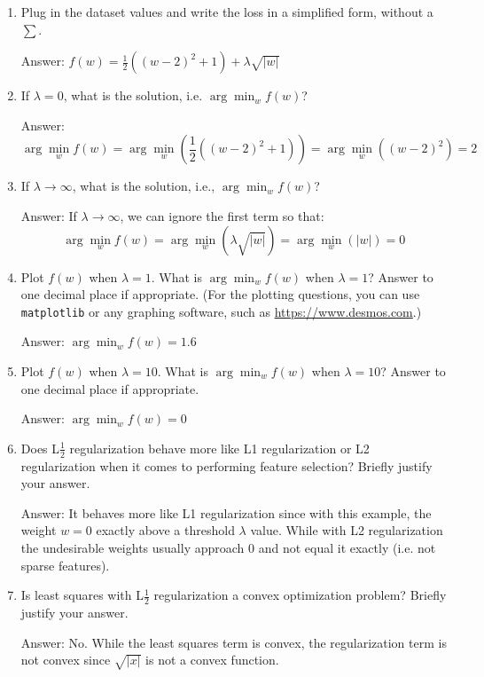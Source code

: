 \documentclass{article}
\newcommand{\blu}[1]{{\textcolor{blu}{#1}}}
\newenvironment{answer}{\par\begingroup\color{gre}Answer: }{\endgroup}
\let\ask\blu
\begin{document}
\begin{enumerate}
\item \ask{Plug in the dataset values and write the loss in a simplified form, without a $\sum$.}
\begin{answer}
    $f(w) = \frac{1}{2} ((w - 2)^2 + 1) + \lambda \sqrt{|w|}$
\end{answer}

\item \ask{If $\lambda=0$, what is the solution, i.e. $\arg \min_w f(w)$?}
\begin{answer}
    \[\arg \min_w f(w) = \arg \min_w \left(\frac{1}{2} ((w - 2)^2 + 1)\right) = \arg \min_w \left( (w - 2)^2 \right) = 2\]
\end{answer}

\item \ask{If $\lambda\rightarrow \infty$, what is the solution, i.e., $\arg \min_w f(w)$?}
\begin{answer}
    If $\lambda\rightarrow \infty$, we can ignore the first term so that:\\
    \[\arg \min_w f(w) = \arg \min_w \left( \lambda \sqrt{|w|} \right) = \arg \min_w \left( |w| \right) = 0\]
\end{answer}

\item \ask{Plot $f(w)$ when $\lambda = 1$. What is $\arg \min_w f(w)$ when $\lambda=1$?} Answer to one decimal place if appropriate. (For the plotting questions, you can use \texttt{matplotlib} or any graphing software, such as \url{https://www.desmos.com}.)
\begin{answer}
    $\arg \min_w f(w) = 1.6$
\end{answer}

\item \ask{Plot $f(w)$ when $\lambda = 10$. What is $\arg \min_w f(w)$ when $\lambda=10$?} Answer to one decimal place if appropriate.
\begin{answer}
    $\arg \min_w f(w) = 0$
\end{answer}

\item \ask{Does L$\frac12$ regularization behave more like L1 regularization or L2 regularization
when it comes to performing feature selection?} Briefly justify your answer.
\begin{answer}
    It behaves more like L1 regularization since with this example, the weight $w=0$ exactly above a threshold $\lambda$ value. While with L2 regularization the undesirable weights usually approach $0$ and not equal it exactly (i.e. not sparse features).
\end{answer}

\item \ask{Is least squares with L$\frac12$ regularization
a convex optimization problem?} Briefly justify your answer.
\begin{answer}
    No. While the least squares term is convex, the regularization term is not convex since $\sqrt{|x|}$ is not a convex function.
\end{answer}
\end{enumerate}
\end{document}
